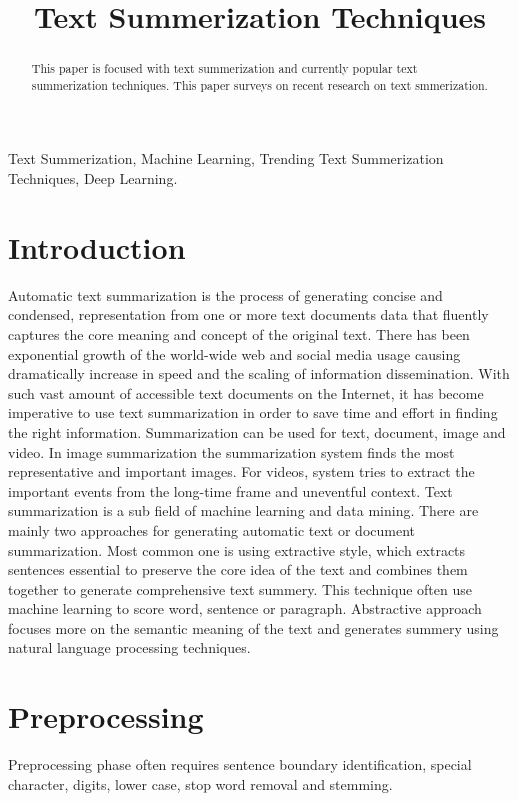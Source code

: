 \documentclass[conference]{IEEEtran}
\begin{document}
\title{Text Summerization Techniques}
\author{
}
\maketitle
\begin{abstract}
This paper is focused with text summerization and currently popular text summerization techniques. This paper surveys on recent research on text smmerization. 
\end{abstract}
\begin{IEEEkeywords}
Text Summerization, Machine Learning, Trending Text Summerization Techniques, Deep Learning.
\end{IEEEkeywords}
\section{Introduction}
Automatic text summarization is the process of generating concise and condensed, representation from one or more text documents data that fluently captures the core meaning and concept of the original text. There has been exponential growth of the world-wide web and social media usage causing dramatically increase in speed and the scaling of information dissemination. With such vast amount of accessible text documents on the Internet, it has become imperative to use text summarization in order to save time and effort in finding the right information. Summarization can be used for text, document, image and video. In image summarization the summarization system finds the most representative and important images. For videos, system tries to extract the important events from the long-time frame and uneventful context. Text summarization is a sub field of machine learning and data mining. There are mainly two approaches for generating automatic text or document summarization. Most common one is using extractive style, which extracts sentences essential to preserve the core idea of the text and combines them together to generate comprehensive text summery. This technique often use machine learning to score word, sentence or paragraph. Abstractive approach focuses more on the semantic meaning of the text and generates summery using natural language processing techniques.  

\section{Preprocessing}
Preprocessing phase often requires sentence boundary identification, special character, digits, lower case, stop word removal and stemming. 
\end{document}
